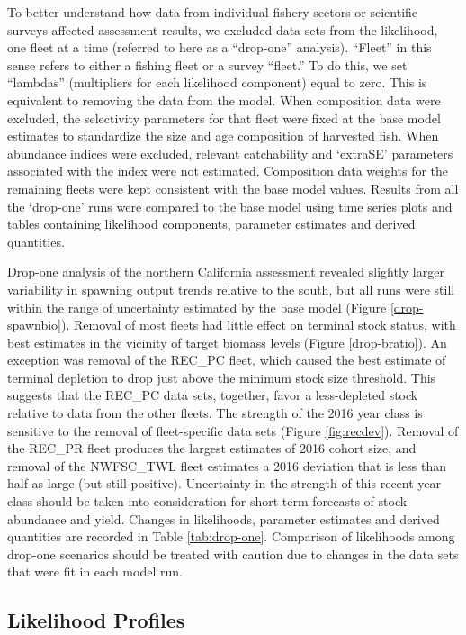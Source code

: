 \documentclass[
  english,
  a4paper,
]{article}
\begin{document}
To better understand how data from individual fishery sectors or scientific surveys affected assessment results, we excluded data sets from the likelihood, one fleet at a time (referred to here as a ``drop-one'' analysis). ``Fleet'' in this sense refers to either a fishing fleet or a survey ``fleet.'' To do this, we set ``lambdas'' (multipliers for each likelihood component) equal to zero. This is equivalent to removing the data from the model. When composition data were excluded, the selectivity parameters for that fleet were fixed at the base model estimates to standardize the size and age composition of harvested fish. When abundance indices were excluded, relevant catchability and `extraSE' parameters associated with the index were not estimated. Composition data weights for the remaining fleets were kept consistent with the base model values. Results from all the `drop-one' runs were compared to the base model using time series plots and tables containing likelihood components, parameter estimates and derived quantities.

Drop-one analysis of the northern California assessment revealed slightly larger variability in spawning output trends relative to the south, but all runs were still within the range of uncertainty estimated by the base model (Figure \ref{drop-spawnbio}). Removal of most fleets had little effect on terminal stock status, with best estimates in the vicinity of target biomass levels (Figure \ref{drop-bratio}). An exception was removal of the REC\_PC fleet, which caused the best estimate of terminal depletion to drop just above the minimum stock size threshold. This suggests that the REC\_PC data sets, together, favor a less-depleted stock relative to data from the other fleets. The strength of the 2016 year class is sensitive to the removal of fleet-specific data sets (Figure \ref{fig:recdev}). Removal of the REC\_PR fleet produces the largest estimates of 2016 cohort size, and removal of the NWFSC\_TWL fleet estimates a 2016 deviation that is less than half as large (but still positive). Uncertainty in the strength of this recent year class should be taken into consideration for short term forecasts of stock abundance and yield. Changes in likelihoods, parameter estimates and derived quantities are recorded in Table \ref{tab:drop-one}. Comparison of likelihoods among drop-one scenarios should be treated with caution due to changes in the data sets that were fit in each model run.

\hypertarget{likelihood-profiles}{%
\subsection{Likelihood Profiles}\label{likelihood-profiles}}
\end{document}
